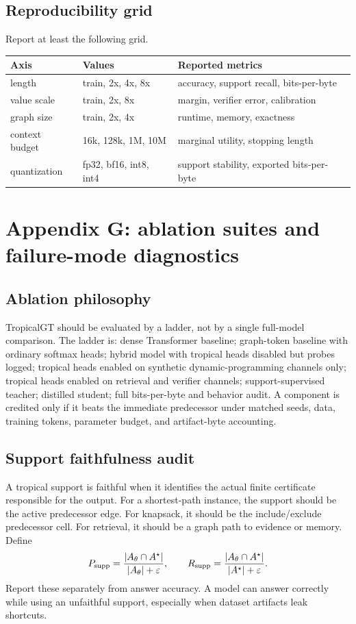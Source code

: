\documentclass[11pt]{article}
\newcommand{\eps}{\varepsilon}
\begin{document}
\subsection{Reproducibility grid}
Report at least the following grid.
\begin{center}
\begin{tabular}{lll}
\toprule
Axis & Values & Reported metrics\\
\midrule
length & train, 2x, 4x, 8x & accuracy, support recall, bits-per-byte\\
value scale & train, 2x, 8x & margin, verifier error, calibration\\
graph size & train, 2x, 4x & runtime, memory, exactness\\
context budget & 16k, 128k, 1M, 10M & marginal utility, stopping length\\
quantization & fp32, bf16, int8, int4 & support stability, exported bits-per-byte\\
\bottomrule
\end{tabular}
\end{center}

\newpage
\section{Appendix G: ablation suites and failure-mode diagnostics}

\subsection{Ablation philosophy}
TropicalGT should be evaluated by a ladder, not by a single full-model comparison. The ladder is: dense Transformer baseline; graph-token baseline with ordinary softmax heads; hybrid model with tropical heads disabled but probes logged; tropical heads enabled on synthetic dynamic-programming channels only; tropical heads enabled on retrieval and verifier channels; support-supervised teacher; distilled student; full bits-per-byte and behavior audit. A component is credited only if it beats the immediate predecessor under matched seeds, data, training tokens, parameter budget, and artifact-byte accounting.

\subsection{Support faithfulness audit}
A tropical support is faithful when it identifies the actual finite certificate responsible for the output. For a shortest-path instance, the support should be the active predecessor edge. For knapsack, it should be the include/exclude predecessor cell. For retrieval, it should be a graph path to evidence or memory. Define
\begin{equation}
P_{\rm supp}=\frac{|A_\theta\cap A^\star|}{|A_\theta|+\eps},\qquad
R_{\rm supp}=\frac{|A_\theta\cap A^\star|}{|A^\star|+\eps}.
\end{equation}
Report these separately from answer accuracy. A model can answer correctly while using an unfaithful support, especially when dataset artifacts leak shortcuts.
\end{document}

